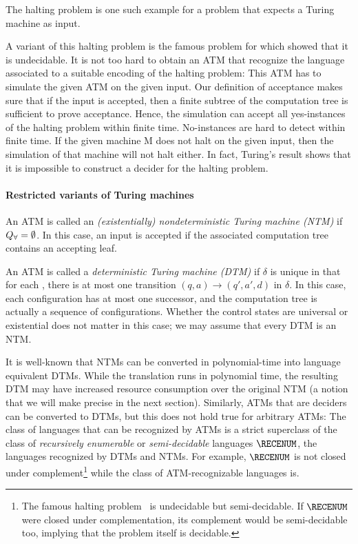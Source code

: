 \documentclass[../../diss.tex]{subfiles}
\begin{document}
The halting problem is one such example for a problem that expects a Turing machine as input.

\begin{problem}
\end{problem}

A variant of this halting problem is the famous problem for which  showed that it is undecidable.
It is not too hard to obtain an ATM that recognize the language associated to a suitable encoding of the halting problem:
This ATM has to simulate the given ATM on the given input.
Our definition of acceptance makes sure that if the input is accepted, then a finite subtree of the computation tree is sufficient to prove acceptance.
Hence, the simulation can accept all yes-instances of the halting problem within finite time.
No-instances are hard to detect within finite time.
If the given machine M does not halt on the given input, then the simulation of that machine will not halt either.
In fact, Turing's result shows that it is impossible to construct a decider for the halting problem.

\paragraph{Restricted variants of Turing machines}

An ATM is called an \emph{(existentially) nondeterministic Turing machine (NTM)} if $Q_\forall = \emptyset$.
In this case, an input is accepted if the associated computation tree contains an accepting leaf.

An ATM is called a \emph{deterministic Turing machine (DTM)} if $\delta$ is unique in that for each , there is at most one transition $(q,a) \to (q',a',d)$ in $\delta$.
In this case, each configuration has at most one successor, and the computation tree is actually a sequence of configurations.
Whether the control states are universal or existential does not matter in this case; we may assume that every DTM is an NTM.\@

It is well-known that NTMs can be converted in polynomial-time into language equivalent DTMs.
While the translation runs in polynomial time, the resulting DTM may have increased resource consumption over the original NTM (a notion that we will make precise in the next section).
Similarly, ATMs that are deciders can be converted to DTMs, but this does not hold true for arbitrary ATMs:
The class of languages that can be recognized by ATMs is a strict superclass of the class of \emph{recursively enumerable} or \emph{semi-decidable} languages $\RECENUM$, the languages recognized by DTMs and NTMs.
For example, $\RECENUM$ is not closed under complement\footnote{The famous halting problem~\cite{Turing36} is undecidable but semi-decidable. If $\RECENUM$ were closed under complementation, its complement would be semi-decidable too, implying that the problem itself is decidable.} while the class of ATM-recognizable languages is.
\end{document}
